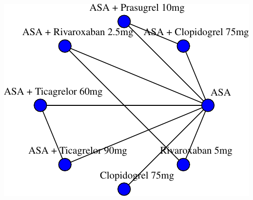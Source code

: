 \documentclass[
  12pt,
]{article}
\begin{document}
\begin{center}\includegraphics{03_supplementary_files/figure-latex/unnamed-chunk-20-1} \end{center}
\end{document}
